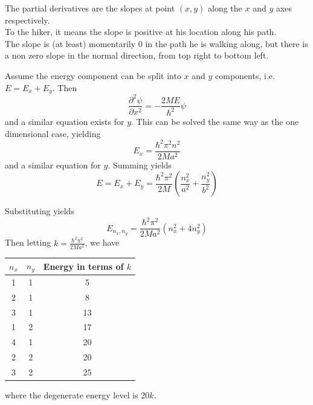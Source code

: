 \documentclass[answers]{exam}
\begin{document}
\begin{questions}
\begin{solution}
	The partial derivatives are the slopes at point $(x,y)$ along the $x$ and $y$ axes respectively.\\
	To the hiker, it means the slope is positive at his location along his path. \\
	The slope is (at least) momentarily 0 in the path he is walking along, but there is a non zero slope in the normal direction, from top right to bottom left.
\end{solution}

 \label{this}

\begin{solution}
	Assume the energy component can be split into $x$ and $y$ components, i.e. $E = E_x + E_y$. Then
	$$\frac{\partial^2\psi}{\partial x^2} = -\frac{2ME}{\hbar^2}\psi$$
	and a similar equation exists for $y$. This can be solved the same way as the one dimensional case, yielding
	$$E_x = \frac{\hbar^2\pi^2n^2}{2Ma^2}$$
	and a similar equation for $y$. Summing yields
	$$E = E_x + E_y = \frac{\hbar^2\pi^2}{2M}\left(\frac{n^2_x}{a^2} + \frac{n^2_y}{b^2}\right)$$
\end{solution}


\begin{solution}
	Substituting yields
	$$E_{n_x,n_y} = \frac{\hbar^2\pi^2}{2Ma^2}(n^2_x + 4n^2_y)$$
	Then letting $k = \frac{\hbar^2\pi^2}{2Ma^2}$, we have
	\begin{center}
	\begin{tabular}{|c|c||c|}
		\hline
		$n_x$ & $n_y$ & Energy in terms of $k$ \\
		\hline\hline
		1 & 1 & 5 \\
		\hline
		2 & 1 & 8 \\
		\hline
		3 & 1 & 13 \\
		\hline
		1 & 2 & 17 \\
		\hline
		4 & 1 & 20 \\
		\hline
		2 & 2 & 20 \\
		\hline
		3 & 2 & 25 \\
		\hline
	\end{tabular}
	\end{center}
	where the degenerate energy level is 20$k$.
\end{solution}


\end{questions}
\end{document}
